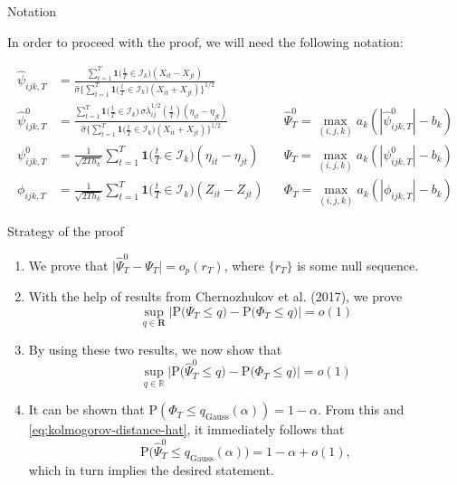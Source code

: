 \documentclass[10pt, handout]{beamer}
\newcommand{\Prob}{\mathrm{P}}
\newcommand{\ind}{\boldsymbol{1}\Big( \frac{t}{T} \in \mathcal{I}_k \Big)} %
\newcommand{\indsmall}{\boldsymbol{1}\big( \frac{t}{T} \in \mathcal{I}_k \big)} %
\begin{document}
\begin{frame}[label = frame_notation]{Notation}
\begin{center}
In order to proceed with the proof, we will need the following notation:
\end{center}
\vspace{-2mm}
\begin{align*}
\hat{\psi}_{ijk, T} &= \frac{\sum\nolimits_{t=1}^T \indsmall (X_{it} -X_{jt})}{\hat{\sigma} \big\{ \sum\nolimits_{t=1}^T \indsmall  (X_{it} + X_{jt} )\big\}^{1/2}} &&\\
\hat{\psi}_{ijk,T}^0 &= \frac{\sum\nolimits_{t=1}^T \indsmall \, \sigma \overline{\lambda}_{ij}^{1/2}(\frac{t}{T}) (\eta_{it} - \eta_{jt})}{ \hat{\sigma} \{ \sum\nolimits_{t=1}^T \indsmall (X_{it} + X_{jt}) \}^{1/2}} &&\hat{\Psi}_T^0 = \max_{(i,j,k)} a_k (|\hat{\psi}_{ijk,T}^0| - b_k)\\
\psi_{ijk,T}^0 &= \frac{1}{\sqrt{2Th_k}} \sum\limits_{t=1}^T \ind (\eta_{it} - \eta_{jt}) &&\Psi_T = \max_{(i,j,k)} a_k (|\psi_{ijk,T}^0| - b_k)\\
\phi_{ijk,T} &= \frac{1}{\sqrt{2 T h_k}} \sum\limits_{t=1}^T \ind (Z_{it} - Z_{jt}) &&\Phi_T = \max_{(i,j,k)} a_k (|\phi_{ijk,T}| - b_k)
\end{align*}
\end{frame}

\begin{frame}{Strategy of the proof}
\begin{enumerate}
\item We prove that  $\big| \hat{\Psi}_T^0 - \Psi_T \big| = o_p(r_T)$, where $\{r_T\}$ is some null sequence.\pause
\item With the help of results from Chernozhukov et al. (2017), we prove
\begin{equation*}\label{eq:kolmogorov-distance}
\sup_{q \in \mathbf{R}} \Big| \Prob\big( \Psi_T \le q \big) - \Prob\big( \Phi_T \le q \big) \Big| = o(1)
\end{equation*}\pause
\vspace{-2mm}
\item By using these two results, we now show that 
\begin{equation}\label{eq:kolmogorov-distance-hat}
\sup_{q \in \mathbb{R}} \Big| \Prob\big( \hat{\Psi}_T^0 \le q \big) - \Prob\big( \Phi_T \le q \big) \Big| = o(1)
\end{equation}\pause
\vspace{-2mm}
\item It can be shown that $\Prob (\Phi_T \le q_{\text{Gauss}}(\alpha)) = 1-\alpha$. From this and \eqref{eq:kolmogorov-distance-hat}, it immediately follows that  
\begin{equation*}
\Prob\big( \hat{\Psi}_T^0 \le q_{\text{Gauss}}(\alpha) \big) = 1 - \alpha + o(1), 
\end{equation*}
which in turn implies the desired statement. 
\end{enumerate}
\end{frame}
\end{document}
